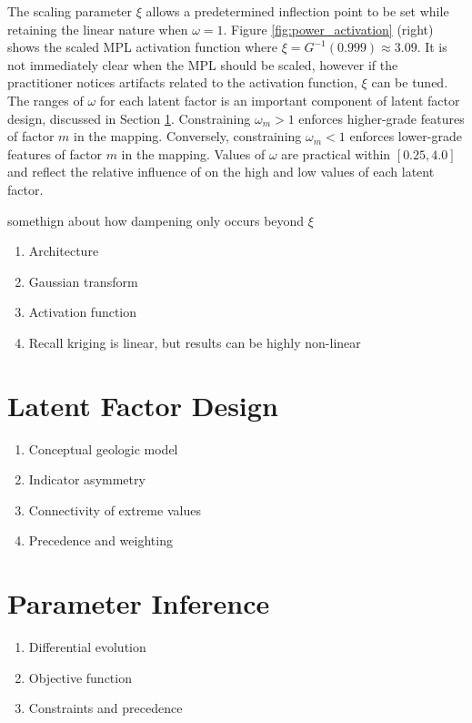 The scaling parameter $\xi$ allows a predetermined inflection point to be set while retaining the linear nature when $\omega = 1$. Figure \ref{fig:power_activation} (right) shows the scaled \gls{MPL} activation function where $\xi = G^{-1}(0.999) \approx 3.09$. It is not immediately clear when the \gls{MPL} should be scaled, however if the practitioner notices artifacts related to the activation function, $\xi$ can be tuned. The ranges of $\omega$ for each latent factor is an important component of latent factor design, discussed in Section \ref{sec:04factord}. Constraining $\omega_{m} > 1$ enforces higher-grade features of factor $m$ in the mapping. Conversely, constraining $\omega_{m} < 1$ enforces lower-grade features of factor $m$ in the mapping. Values of $\omega$ are practical within $[0.25, 4.0]$ and reflect the relative influence of on the high and low values of each latent factor.

somethign about how dampening only occurs beyond $\xi$

\begin{enumerate}[noitemsep]
    \item Architecture
    \item Gaussian transform
    \item Activation function
    \item Recall kriging is linear, but results can be highly non-linear

\end{enumerate}


\FloatBarrier
\section{Latent Factor Design}
\label{sec:04factord}

\begin{enumerate}[noitemsep]
    \item Conceptual geologic model
    \item Indicator asymmetry
    \item Connectivity of extreme values
    \item Precedence and weighting
\end{enumerate}


\FloatBarrier
\section{Parameter Inference}
\label{sec:04paraminfer}

\begin{enumerate}[noitemsep]
    \item Differential evolution
    \item Objective function
    \item Constraints and precedence

\end{enumerate}


